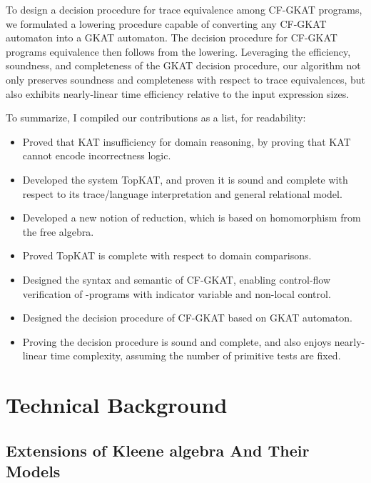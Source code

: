 To design a decision procedure for trace equivalence among CF-GKAT programs, we formulated a lowering procedure capable of converting any CF-GKAT automaton into a GKAT automaton.
The decision procedure for CF-GKAT programs equivalence then follows from the lowering.
Leveraging the efficiency, soundness, and completeness of the GKAT decision procedure, our algorithm not only preserves soundness and completeness with respect to trace equivalences, but also exhibits nearly-linear time efficiency relative to the input expression sizes.

To summarize, I compiled our contributions as a list, for readability:
\begin{itemize}
    \item Proved that KAT insufficiency for domain reasoning, by proving that KAT cannot encode incorrectness logic.
    \item Developed the system TopKAT, and proven it is sound and complete with respect to its trace/language interpretation and general relational model.
    \item Developed a new notion of reduction, which is based on homomorphism from the free algebra.
    \item Proved TopKAT is complete with respect to domain comparisons.
    \item Designed the syntax and semantic of CF-GKAT, enabling control-flow verification of -programs with indicator variable and non-local control.
    \item Designed the decision procedure of CF-GKAT based on GKAT automaton.
    \item Proving the decision procedure is sound and complete, and also enjoys nearly-linear time complexity, assuming the number of primitive tests are fixed.
\end{itemize}

\section{Technical Background}

\subsection{Extensions of Kleene algebra And Their Models}

